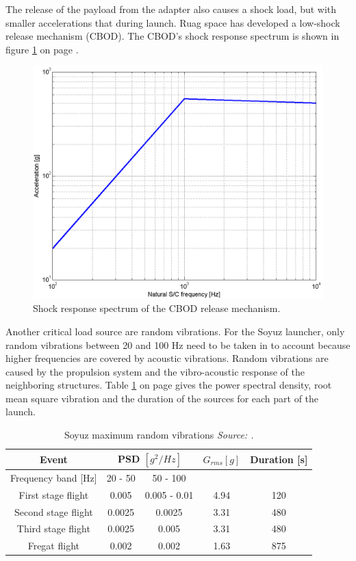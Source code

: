 The release of the payload from the adapter also causes a shock load, but with smaller accelerations that during launch. Ruag space has developed a low-shock release mechanism (\ac{CBOD}). The \acs{CBOD}'s shock response spectrum is shown in figure \ref{fig:CBOD_SRS} on page \pageref{fig:CBOD_SRS}.

\begin{figure}[ht!]
\centering
\includegraphics[width=1.0\textwidth, angle=0]{chapters/img/CBOD_release_acceleration.png}
\caption{Shock response spectrum of the \acs{CBOD} release mechanism.}
\label{fig:CBOD_SRS}
\end{figure}

Another critical load source are random vibrations. For the Soyuz launcher, only random vibrations between 20 and 100 Hz need to be taken in to account because higher frequencies are covered by acoustic vibrations. Random vibrations are caused by the propulsion system and the vibro-acoustic response of the neighboring structures. Table \ref{tab:random_vibr} on page \pageref{tab:random_vibr} gives the power spectral density, root mean square vibration and the duration of the sources for each part of the launch.

\begin{table}[H!]
\centering
\begin{tabular}{ccccc}
\toprule
 Event & \multicolumn{2}{c}{PSD $[g^2/Hz]$} & $G_{rms} [g]$ & Duration [s] \\
 \midrule
 Frequency band [Hz] & 20 - 50 & 50 - 100 & & \\
 \midrule
 First stage flight & 0.005 & 0.005 - 0.01 & 4.94 & 120 \\
 Second stage flight & 0.0025 & 0.0025 & 3.31 & 480 \\
 Third stage flight & 0.0025 & 0.005 & 3.31 & 480 \\
 Fregat flight & 0.002 & 0.002 & 1.63 & 875 \\
 \bottomrule
 \end{tabular}
 \caption{Soyuz maximum random vibrations \emph{ Source: \cite{soyuzman}.}}
\label{tab:random_vibr}
\end{table}

